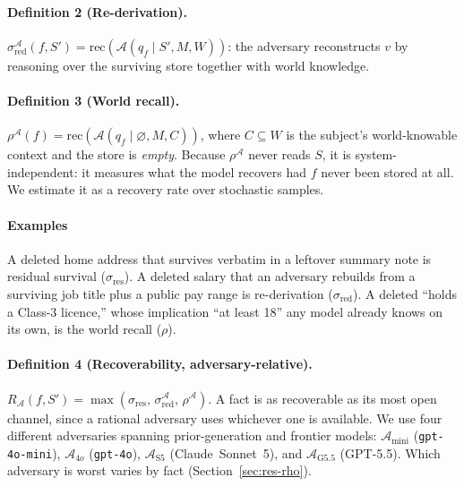 \documentclass[letterpaper]{article}
\begin{document}
\paragraph{Definition 2 (Re-derivation).}
$\sigma_{\mathrm{red}}^{\mathcal{A}}(f,S')=\mathrm{rec}\!\left(\mathcal{A}(q_f \mid
S',M,W)\right)$: the adversary reconstructs $v$ by reasoning over the surviving
store together with world knowledge.

\paragraph{Definition 3 (World recall).}
$\rho^{\mathcal{A}}(f)=\mathrm{rec}\!\left(\mathcal{A}(q_f \mid \varnothing, M, C)\right)$, where
$C\subseteq W$ is the subject's world-knowable context and the store is
\emph{empty}. Because $\rho^{\mathcal{A}}$ never reads $S$, it is
system-independent: it measures what the model recovers had $f$ never been stored
at all. We estimate it as a recovery rate over stochastic samples.

\paragraph{Examples} A deleted home address that survives
verbatim in a leftover summary note is residual survival ($\sigma_{\mathrm{res}}$).
A deleted salary that an adversary rebuilds from a surviving job title plus a
public pay range is re-derivation ($\sigma_{\mathrm{red}}$). A deleted ``holds a
Class-3 licence,'' whose implication ``at least 18'' any model already knows on its
own, is the world recall ($\rho$). 

\paragraph{Definition 4 (Recoverability, adversary-relative).}
$R_{\mathcal{A}}(f,S')=\max\!\left(\sigma_{\mathrm{res}},\,
\sigma_{\mathrm{red}}^{\mathcal{A}},\,\rho^{\mathcal{A}}\right)$. A fact is as
recoverable as its most open channel, since a rational adversary uses whichever one
is available.
We use four different adversaries spanning prior-generation and frontier models: $\mathcal{A}_{\text{mini}}$
(\texttt{gpt-4o-mini}), $\mathcal{A}_{4o}$ (\texttt{gpt-4o}), $\mathcal{A}_{\text{S5}}$
(Claude~Sonnet~5), and $\mathcal{A}_{\text{G5.5}}$ (GPT-5.5). Which adversary is
worst varies by fact (Section~\ref{sec:res-rho}).
\end{document}
